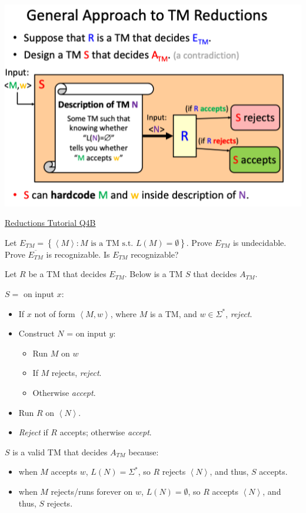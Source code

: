 \documentclass[10pt,landscape,a4paper]{article}
\newcommand{\set}[1]{\left \{ #1 \right \}}
\newcommand{\encoding}[1]{\left \langle #1 \right \rangle}
\begin{document}
\begin{multicols*}{3}
\includegraphics[scale=0.5]{general_approach_to_tm_reductions}

\underline{Reductions Tutorial Q4B}

Let $E_{TM} = \set{\encoding{M}: M \text{ is a TM s.t. } L(M) = \emptyset}$. Prove $E_{TM}$ is undecidable. Prove $\overline{E_{TM}}$ is recognizable. Is $E_{TM}$ recognizable?

Let $R$ be a TM that decides $E_{TM}$. Below is a TM $S$ that decides $A_{TM}$.

$S = $ on input $x$:

\begin{itemize}
    \item If $x$ not of form $\encoding{M, w}$, where $M$ is a TM, and $w \in \Sigma^*$, \emph{reject}.
    \item Construct $N$ = on input $y$:
    \begin{itemize}
        \item Run $M$ on $w$
        \item If $M$ rejects, \emph{reject}.
        \item Otherwise \emph{accept}.
    \end{itemize}
    \item Run $R$ on $\encoding{N}$.
    \item \emph{Reject} if $R$ accepts; otherwise \emph{accept}.
\end{itemize}

$S$ is a valid TM that decides $A_{TM}$ because:

\begin{itemize}
    \item when $M$ accepts $w$, $L(N) = \Sigma^*$, so $R$ rejects $\encoding{N}$, and thus, $S$ accepts.
    \item when $M$ rejects/runs forever on $w$, $L(N) = \emptyset$, so $R$ accepts $\encoding{N}$, and thus, $S$ rejects.
\end{itemize}


\end{multicols*}
\end{document}
